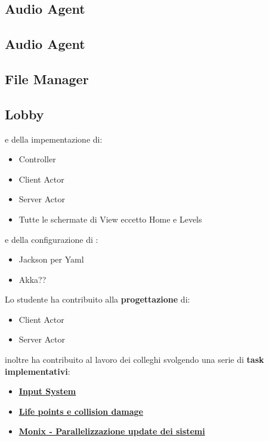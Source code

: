 \subsection{Audio Agent}
\subsection{Audio Agent}
\subsection{File Manager}
\subsection{Lobby}







e della impementazione di:

\begin{itemize}
	\item Controller
	\item Client Actor
	\item Server Actor
    \item Tutte le schermate di View eccetto Home e Levels
\end{itemize}

e della configurazione di :

\begin{itemize}
	\item Jackson per Yaml
	\item Akka??
\end{itemize}

Lo studente ha contribuito alla \textbf{progettazione} di:
\begin{itemize}
	\item Client Actor 
	\item Server Actor
\end{itemize}

inoltre ha contribuito al lavoro dei colleghi svolgendo una serie di \textbf{task implementativi}:
\begin{itemize}
	\item \hyperref[subsubsec:input_sys]{\textbf{Input System}}
	\item \hyperref[subsubsec:damage]{\textbf{Life points e collision damage}}
	\item \hyperref[subsubsec:monix_sys]{\textbf{Monix - Parallelizzazione update dei sistemi}}
\end{itemize}